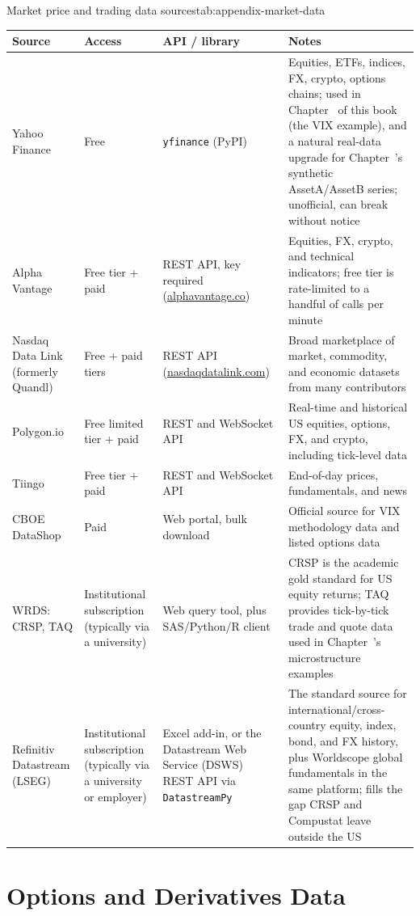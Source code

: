\documentclass[../ai_in_finance]{subfiles}
\begin{document}
\begin{booktable}[htbp]{Market price and trading data sources}{tab:appendix-market-data}
\begin{tabular}{L{2.6cm}L{2.2cm}L{3.6cm}L{4.4cm}}
\toprule
Source & Access & API / library & Notes \\
\midrule
Yahoo Finance & Free & \texttt{yfinance} (PyPI) & Equities, ETFs, indices, FX, crypto, options chains; used in Chapter~ of this book (the VIX example), and a natural real-data upgrade for Chapter~'s synthetic AssetA/AssetB series; unofficial, can break without notice \\
Alpha Vantage & Free tier + paid & REST API, key required (\url{alphavantage.co}) & Equities, FX, crypto, and technical indicators; free tier is rate-limited to a handful of calls per minute \\
Nasdaq Data Link (formerly Quandl) & Free + paid tiers & REST API (\url{nasdaqdatalink.com}) & Broad marketplace of market, commodity, and economic datasets from many contributors \\
Polygon.io & Free limited tier + paid & REST and WebSocket API & Real-time and historical US equities, options, FX, and crypto, including tick-level data \\
Tiingo & Free tier + paid & REST and WebSocket API & End-of-day prices, fundamentals, and news \\
CBOE DataShop & Paid & Web portal, bulk download & Official source for VIX methodology data and listed options data \\
WRDS: CRSP, TAQ & Institutional subscription (typically via a university) & Web query tool, plus SAS/Python/R client & CRSP is the academic gold standard for US equity returns; TAQ provides tick-by-tick trade and quote data used in Chapter~'s microstructure examples \\
Refinitiv Datastream (LSEG) & Institutional subscription (typically via a university or employer) & Excel add-in, or the Datastream Web Service (DSWS) REST API via \texttt{DatastreamPy} & The standard source for international/cross-country equity, index, bond, and FX history, plus Worldscope global fundamentals in the same platform; fills the gap CRSP and Compustat leave outside the US \\
\bottomrule
\end{tabular}
\end{booktable}

\section{Options and Derivatives Data}
\label{sec:appendix-options-data}
\end{document}
